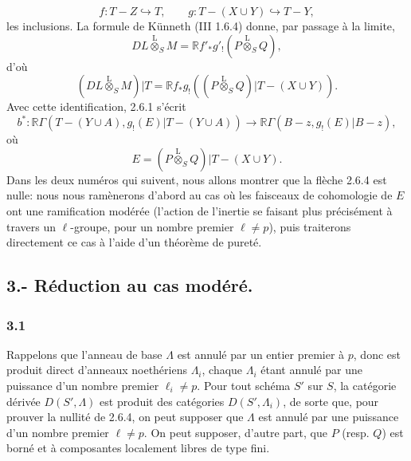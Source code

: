 \documentclass[11pt]{article}
\newcommand{\R}{\mathbb{R}}\newcommand{\RHomCore}{\mathbb{R}\mathrm{Hom}}
\providecommand{\lten}{\overset{\mathrm L}{\otimes}}
\providecommand{\lten}{\overset{\mathrm L}{\otimes}}
\providecommand{\lten}{\overset{\mathrm L}{\otimes}}
\providecommand{\R}{\mathrm R}
\providecommand{\lten}{\overset{\mathrm L}{\otimes}}
\providecommand{\lten}{\overset{\mathrm L}{\otimes}}
\providecommand{\lten}{\overset{\mathrm L}{\otimes}}
\providecommand{\lten}{\overset{\mathrm L}{\otimes}}
\begin{document}
\[
f:T-Z\hookrightarrow T,\qquad
g:T-(X\cup Y)\hookrightarrow T-Y,
\]
les inclusions. La formule de Künneth (III 1.6.4) donne, par passage à la limite,
\[
DL\lten_SM=\R f'_*g'_!(P\lten_SQ),
\]
d'où
\begin{equation}
(DL\lten_SM)|T=\R f_*g_!((P\lten_SQ)|T-(X\cup Y)).
\tag{2.6.3}
\end{equation}
Avec cette identification, 2.6.1 s'écrit
\begin{equation}
b^*:\R\Gamma(T-(Y\cup A),g_!(E)|T-(Y\cup A))
 \longrightarrow \R\Gamma(B-z,g_!(E)|B-z),
\tag{2.6.4}
\end{equation}
où
\[
E=(P\lten_SQ)|T-(X\cup Y).
\]
Dans les deux numéros qui suivent, nous allons montrer que la flèche 2.6.4 est nulle: nous nous ramènerons d'abord au cas où les faisceaux de cohomologie de $E$ ont une ramification modérée (l'action de l'inertie se faisant plus précisément à travers un $\ell$-groupe, pour un nombre premier $\ell\ne p$), puis traiterons directement ce cas à l'aide d'un théorème de pureté.

\subsection*{3.- Réduction au cas modéré.}

\subsubsection*{3.1}
Rappelons que l'anneau de base $\Lambda$ est annulé par un entier premier à $p$, donc est produit direct d'anneaux noethériens $\Lambda_i$, chaque $\Lambda_i$ étant annulé par une puissance d'un nombre premier $\ell_i\ne p$. Pour tout schéma $S'$ sur $S$, la catégorie dérivée $D(S',\Lambda)$ est produit des catégories $D(S',\Lambda_i)$, de sorte que, pour prouver la nullité de 2.6.4, on peut supposer que $\Lambda$ est annulé par une puissance d'un nombre premier $\ell\ne p$. On peut supposer, d'autre part, que $P$ (resp. $Q$) est borné et à composantes localement libres de type fini.
\end{document}
